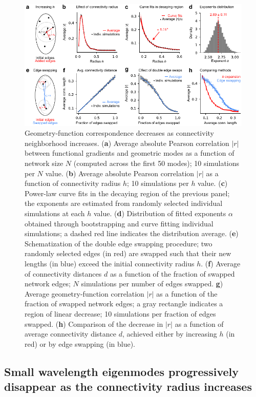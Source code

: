 \documentclass{article}
\begin{document}
\begin{figure}[t]
    \centering
    \includegraphics[width=0.95\linewidth]{figures/figure2.pdf}
    \caption{Geometry-function correspondence decreases as connectivity neighborhood increases. (\textbf{a}) Average absolute Pearson correlation $|r|$ between functional gradients and geometric modes as a function of network size $N$ (computed across the first 50 modes); 10 simulations per $N$ value. (\textbf{b}) Average absolute Pearson correlation $|r|$ as a function of connectivity radius $h$; 10 simulations per $h$ value. (\textbf{c}) Power-law curve fits in the decaying region of the previous panel; the exponents are estimated from randomly selected individual simulations at each $h$ value. (\textbf{d}) Distribution of fitted exponents $\alpha$ obtained through bootstrapping and curve fitting individual simulations; a dashed red line indicates the distribution average. (\textbf{e}) Schematization of the double edge swapping procedure; two randomly selected edges (in red) are swapped such that their new lengths (in blue) exceed the initial connectivity radius $h$. (\textbf{f}) Average of connectivity distances $d$ as a function of the fraction of swapped network edges; $N$ simulations per number of edges swapped. \textbf{g}) Average geometry-function correlation $|r|$ as a function of the fraction of swapped network edges; a gray rectangle indicates a region of linear decrease; 10 simulations per fraction of edges swapped. (\textbf{h}) Comparison of the decrease in $|r|$ as a function of average connectivity distance $d$, achieved either by  increasing $h$ (in red) or by edge swapping (in blue).}
    \label{fig2}
    \hrulefill
\end{figure}

\subsection*{Small wavelength eigenmodes progressively disappear as the connectivity radius increases}
\end{document}
